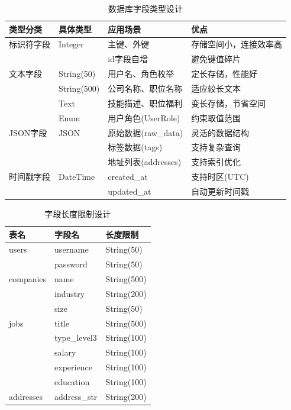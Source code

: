  \begin{table}[!htbp]
    \caption{数据库字段类型设计}
    \label{tab:field_types}
    \centering
    \begin{tabular}{@{}llll@{}} \toprule
      \textbf{类型分类} & \textbf{具体类型} & \textbf{应用场景} & \textbf{优点} \\ \midrule
      标识符字段 & Integer & 主键、外键 & 存储空间小，连接效率高 \\
                &         & id字段自增 & 避免键值碎片 \\ \midrule
      文本字段   & String(50) & 用户名、角色枚举 & 定长存储，性能好 \\
                & String(500) & 公司名称、职位名称 & 适应较长文本 \\
                & Text & 技能描述、职位福利 & 变长存储，节省空间 \\
                & Enum & 用户角色(UserRole) & 约束取值范围 \\ \midrule
      JSON字段   & JSON & 原始数据(raw\_data) & 灵活的数据结构 \\
                &      & 标签数据(tags) & 支持复杂查询 \\
                &      & 地址列表(addresses) & 支持索引优化 \\ \midrule
      时间戳字段 & DateTime & created\_at & 支持时区(UTC) \\
                &          & updated\_at & 自动更新时间戳 \\ \bottomrule
    \end{tabular}
  \end{table}
  
  \begin{table}[!htbp]
    \caption{字段长度限制设计}
    \label{tab:field_lengths}
    \centering
    \begin{tabular}{@{}lll@{}} \toprule
      \textbf{表名} & \textbf{字段名} & \textbf{长度限制} \\ \midrule
      users & username & String(50) \\
            & password & String(50) \\ \midrule
      companies & name & String(500) \\
               & industry & String(200) \\
               & size & String(50) \\ \midrule
      jobs & title & String(500) \\
           & type\_level3 & String(100) \\
           & salary & String(100) \\
           & experience & String(100) \\
           & education & String(100) \\ \midrule
      addresses & address\_str & String(200) \\ \bottomrule
    \end{tabular}
  \end{table}
  

